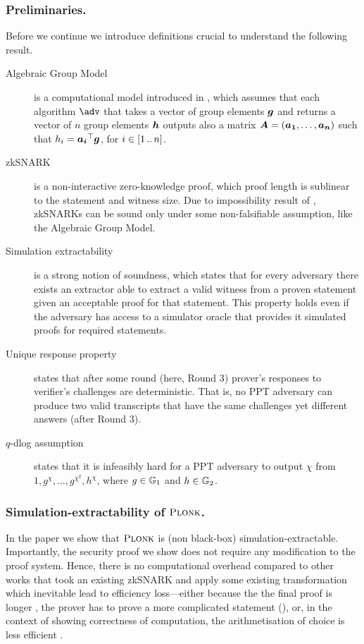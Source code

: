 \documentclass[runningheads,11pt]{llncs}
\let\spvec\vec
\let\vec\accentvec
\let\vec\spvec
\def\vec#1{\mathchoice{\mbox{\boldmath$\displaystyle#1$}}
	{\mbox{\boldmath$\textstyle#1$}}
	{\mbox{\boldmath$\scriptstyle#1$}}
	{\mbox{\boldmath$\scriptscriptstyle#1$}}}
\begin{document}
	\subsubsection*{Preliminaries.}
	Before we continue we introduce definitions crucial to understand the following result. 
	\begin{description}
		\item[Algebraic Group Model] is a computational model introduced in \cite{C:FucKilLos18}, which assumes that each algorithm $\adv$ that takes a vector of group elements $\vec{g}$ and returns a vector of $n$ group elements $\vec{h}$ outputs also a matrix $\vec{A} = (\vec{a_1}, \ldots, \vec{a_n})$ such that $h_i = \vec{a_i}^\top \vec{g}$, for $i \in [1 \, .. \, n]$.
		\item[zkSNARK] is a non-interactive zero-knowledge proof, which proof length is sublinear to the statement and witness size. Due to impossibility result of \cite{STOC:GenWic11}, zkSNARKs can be sound only under some non-falsifiable assumption, like the Algebraic Group Model.
		\item[Simulation extractability] is a strong notion of soundness, which states that for every adversary there exists an extractor able to extract a valid witness from a proven statement given an acceptable proof for that statement. This property holds even if the adversary has access to a simulator oracle that provides it simulated proofs for required statements. 
		\item[Unique response property] states that after some round (here, Round 3) prover's responses to verifier's challenges are deterministic. That is, no PPT adversary can produce two valid transcripts that have the same challenges yet different answers (after Round 3).
		\item[$q$-dlog assumption] states that it is infeasibly hard for a PPT adversary to output $\chi$ from $1, g^{\chi}, \ldots, g^{\chi^q}, h^{\chi}$, where $g \in \mathbb{G}_1$ and $h \in \mathbb{G}_2$.
	\end{description}
	
	\subsubsection*{Simulation-extractability of $\textsc{Plonk}$.}
	In the paper we show that $\textsc{Plonk}$ is (non black-box) simulation-extractable. Importantly, the security proof we show does not require any modification to the proof system. 
	Hence, there is no computational overhead compared to other works that took an existing zkSNARK and apply some existing transformation which inevitable lead to efficiency loss---either because the the final proof is longer \cite{EPRINT:BowGab18}, the prover has to prove a more complicated statement (\cite{ASIACCS:DerSla18,EPRINT:AbdRamSla20}), or, in the context of showing correctness of computation, the arithmetisation of choice is less efficient \cite{C:GroMal17}.
	
\end{document}
